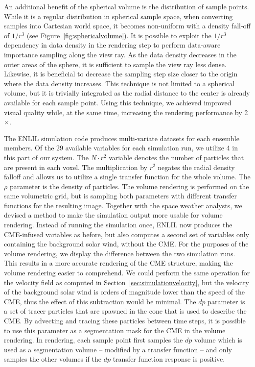 \documentclass[journal]{vgtc}                %
\begin{document}
 An additional benefit of the spherical volume is the distribution of sample points. While it is a regular distribution in spherical sample space, when converting samples into Cartesian world space, it becomes non-uniform with a density fall-off of $1/r^3$ (see Figure~\ref{fig:sphericalvolume}). It is possible to exploit the $1/r^3$ dependency in data density in the rendering step to perform data-aware importance sampling along the view ray. As the data density decreases in the outer areas of the sphere, it is sufficient to sample the view ray less dense. Likewise, it is beneficial to decrease the sampling step size closer to the origin where the data density increases. This technique is not limited to a spherical volume, but it is trivially integrated as the radial distance to the center is already available for each sample point. Using this technique, we achieved improved visual quality while, at the same time, increasing the rendering performance by 2$\times$.

 The ENLIL simulation code produces multi-variate datasets for each ensemble members. Of the 29 available variables for each simulation run, we utilize 4 in this part of our system. The $N \cdot r^2$ variable denotes the number of particles that are present in each voxel. The multiplication by $r^2$ negates the radial density falloff and allows us to utilize a single transfer function for the whole volume. The $\rho$ parameter is the density of particles. The volume rendering is performed on the same volumetric grid, but is sampling both parameters with different transfer functions for the resulting image. Together with the space weather analysts, we devised a method to make the simulation output more usable for volume rendering. Instead of running the simulation once, ENLIL now produces the CME-infused variables as before, but also computes a second set of variables only containing the background solar wind, without the CME. For the purposes of the volume rendering, we display the difference between the two simulation runs. This results in a more accurate rendering of the CME structure, making the volume rendering easier to comprehend. We could perform the same operation for the velocity field as computed in Section~\ref{sec:simulationvelocity}, but the velocity of the background solar wind is orders of magnitude lower than the speed of the CME, thus the effect of this subtraction would be minimal. The $dp$ parameter is a set of tracer particles that are spawned in the cone that is used to describe the CME. By advecting and tracing these particles between time steps, it is possible to use this parameter as a segmentation mask for the CME in the volume rendering. In rendering, each sample point first samples the $dp$ volume which is used as a segmentation volume  -- modified by a transfer function -- and only samples the other volumes if the $dp$ transfer function response is positive.
\end{document}
